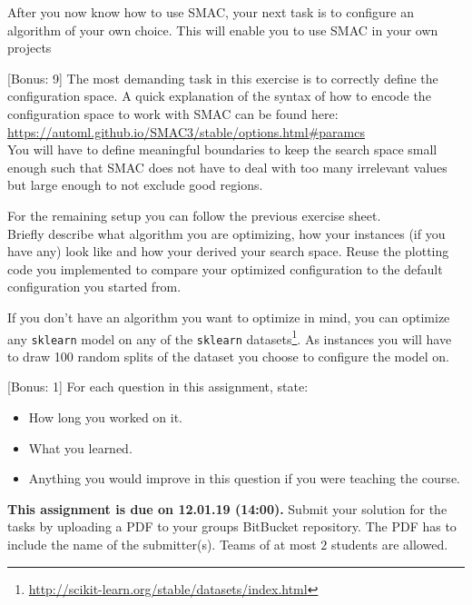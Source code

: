 \documentclass{exam}
\newcommand{\duedate}{12.01.19 (14:00)}
\newcommand{\due}{{\bf This assignment is due on \duedate.} }
\begin{document}
	\gccs
	After you now know how to use SMAC,
	your next task is to configure an algorithm of your own choice. This will enable you to use SMAC in your own projects
	
	\begin{questions}
		
		[Bonus: 9]
		The most demanding task in this exercise is to correctly define the configuration space. A quick explanation of the syntax of how to encode the configuration space
		to work with SMAC can be found here: \url{https://automl.github.io/SMAC3/stable/options.html#paramcs}\\
		You will have to define meaningful boundaries to keep the search space small enough such that SMAC does not have to deal with too many irrelevant values but large
		enough to not exclude good regions.
		
		For the remaining setup you can follow the previous exercise sheet.\\
		Briefly describe what algorithm you are optimizing, how your instances (if you have any) look like and how your derived your search space.
		Reuse the plotting code you implemented to compare your optimized configuration to the default configuration you started from.
		
		If you don't have an algorithm you want to optimize in mind, you can optimize any \texttt{sklearn} model on any of the \texttt{sklearn} datasets\footnote{\url{http://scikit-learn.org/stable/datasets/index.html}}. As instances you will have to draw 100 random splits of the dataset you choose to configure the model on.
		
		[Bonus: 1]
		For each question in this assignment, state:
		\begin{itemize}
			\item How long you worked on it.
			\item What you learned.
			\item Anything you would improve in this question if you were teaching the course.
		\end{itemize}
	\end{questions}

\noindent
\due Submit your solution for the tasks by uploading a PDF to your groups BitBucket repository. The PDF has to include the name of the submitter(s). Teams of at most $2$ students are allowed.
\end{document}
